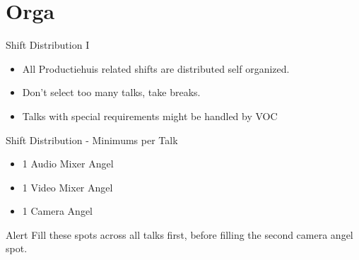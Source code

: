 \documentclass[aspectratio=169]{beamer}
\begin{document}
\section{Orga} 				%



\begin{frame}{Shift Distribution I}		%
\begin{itemize}
	\item All Productiehuis related shifts are distributed self organized.
	\item Don't select too many talks, take breaks.
	\item Talks with special requirements might be handled by VOC
\end{itemize} 
\end{frame}
\begin{frame}{Shift Distribution - Minimums per Talk}		%
    \begin{itemize}
        \item 1 Audio Mixer Angel
        \item 1 Video Mixer Angel
        \item 1 Camera Angel
    \end{itemize}
    \begin{alertblock}{Alert}
        Fill these spots across all talks first, before filling the second camera angel spot.
    \end{alertblock}
\end{frame}
\end{document}
